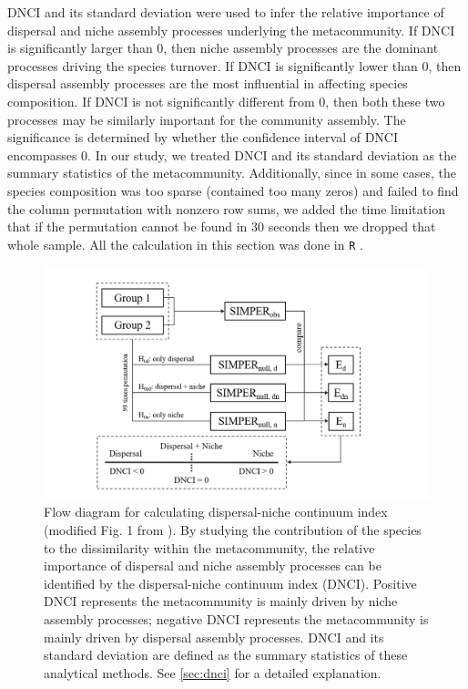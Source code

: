 	DNCI and its standard deviation were used to infer the relative importance of dispersal and niche assembly processes underlying the metacommunity. If DNCI is significantly larger than 0, then niche assembly processes are the dominant processes driving the species turnover. If DNCI is significantly lower than 0, then dispersal assembly processes are the most influential in affecting species composition. If DNCI is not significantly different from 0, then both these two processes may be similarly important for the community assembly. The significance is determined by whether the confidence interval of DNCI encompasses 0. In our study, we treated DNCI and its standard deviation as the summary statistics of the metacommunity. Additionally, since in some cases, the species composition was too sparse (contained too many zeros) and failed to find the column permutation with nonzero row sums, we added the time limitation that if the permutation cannot be found in 30 seconds then we dropped that whole sample. All the calculation in this section was done in \texttt{R} \citep{R}.
	
	
	\begin{figure}
		\centering
		\includegraphics[width=\linewidth]{./figures/ppt/DNCI.png}
		\caption[Flow diagram for calculating dispersal-niche continuum index.]{\small
			Flow diagram for calculating dispersal-niche continuum index (modified Fig. 1 from \citet{vilmi2021dispersal}). By studying the contribution of the species to the dissimilarity within the metacommunity, the relative importance of dispersal and niche assembly processes can be identified by the dispersal-niche continuum index (DNCI). Positive DNCI represents the metacommunity is mainly driven by niche assembly processes; negative DNCI represents the metacommunity is mainly driven by dispersal assembly processes. DNCI and its standard deviation are defined as the summary statistics of these analytical methods. See \autoref{sec:dnci} for a detailed explanation.}
		\label{fig:DNCI}
	\end{figure}

